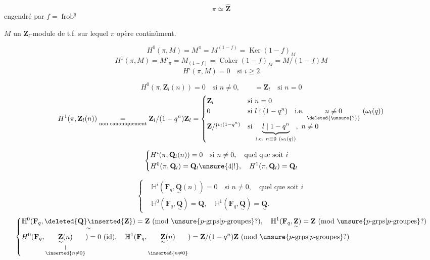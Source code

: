 \[
\pi\simeq\widehat{\mathbf Z}
\]
engendré par $f=\operatorname{frob}^q$

$M$ un $\mathbf Z_l$-module de t.f. sur lequel $\pi$ opère continûment.

\[
H^0(\pi,M)=M^\pi=M^{(1-f)}=\operatorname{Ker}(1-f)_M
\]
\[
H^1(\pi,M)=M'_\pi=M_{(1-f)}=\operatorname{Coker}(1-f)_M=M/(1-f)M
\]
\[
H^i(\pi,M)=0\quad\text{si }i\geq2
\]

\[
H^0(\pi,\mathbf Z_l(n))=0\quad\text{si }n\neq0,\qquad=\mathbf Z_l\quad\text{si }n=0
\]
\[
H^1(\pi,\mathbf Z_l(n))\underset{\text{non canoniquement}}{=}
\mathbf Z_l/(1-q^n)\mathbf Z_l
=\begin{cases}
\mathbf Z_l&\text{si }n=0\\
0&\text{si }l\nmid(1-q^n)\quad\text{i.e. }\underset{\deleted{\unsure{?}}}{n\not\equiv0}\ (\omega_l(q))\\
\mathbf Z/l^{v_l(1-q^n)}&\text{si }\underbrace{l\mid1-q^n}_{\text{i.e. }n\equiv0\ (\omega_l(q))},\ n\neq0
\end{cases}
\]

\[
\left\{\begin{aligned}
&H^i(\pi,\mathbf Q_l(n))=0\quad\text{si }n\neq0,\quad\text{quel que soit }i\\
&H^0(\pi,\mathbf Q_l)=\mathbf Q_l\unsure{4|!},\quad H^1(\pi,\mathbf Q_l)=\mathbf Q_l
\end{aligned}\right.
\]

\[
\left\{\begin{aligned}
&\mathbb H^i(\mathbf F_q,\underset{\sim}{\mathbf Q}(n))=0\quad\text{si }n\neq0,\quad\text{quel que soit }i\\
&\mathbb H^0(\mathbf F_q,\underset{\sim}{\mathbf Q})=\mathbf Q,\quad\mathbb H^1(\mathbf F_q,\underset{\sim}{\mathbf Q})=\underset{\sim}{\mathbf Q}.
\end{aligned}\right.
\]
\[
\left\{\begin{aligned}
&\mathbb H^0(\mathbf F_q,\underset{\sim}{\deleted{\mathbf Q}\inserted{\mathbf Z}})=\mathbf Z\ (\text{mod }\unsure{p\text{-grps}|p\text{-groupes}}?),\quad
\mathbb H^1(\mathbf F_q,\underset{\sim}{\mathbf Z})=\mathbf Z\ (\text{mod }\unsure{p\text{-grps}|p\text{-groupes}}?)\\
&H^0(\mathbf F_q,\underset{\substack{\vert\\\inserted{n\neq0}}}{\underset{\sim}{\mathbf Z}(n)})=0\ (\text{id}),\quad
\mathbb H^1(\mathbf F_q,\underset{\substack{\vert\\\inserted{n\neq0}}}{\underset{\sim}{\mathbf Z}(n)})=\mathbf Z/(1-q^n)\mathbf Z\ (\text{mod }\unsure{p\text{-grps}|p\text{-groupes}}?)
\end{aligned}\right.
\]

